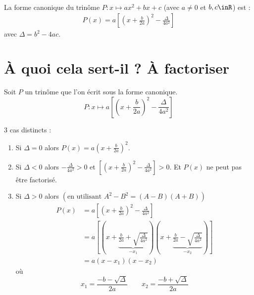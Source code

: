 \documentclass[12pt,fleqn]{report} %
\begin{document}
\begin{definition}\text{ }\\
	La forme canonique du trinôme $P:x \mapsto a x^2 + bx + c$ (avec $a\neq 0$ et $b,c\inR$) est :
	\begin{align*}
	P(x) = a \left[\left(x + \frac{b}{2a}\right)^2 - \frac{\Delta}{4a^2} \right]
	\end{align*}
	avec $\Delta = b^2 - 4ac$.
	
\end{definition}


\section{À quoi cela sert-il ? À factoriser}

Soit $P$ un trinôme que l'on écrit sous la forme canonique.
\[
P : x \mapsto a \left[\left(x + \frac{b}{2a}\right)^2 - \frac{\Delta}{4a^2} \right]
\]

3 cas distincts : 
\begin{enumerate}
	\item Si $\Delta = 0$ alors $P(x) = a \left( x + \frac{b}{2a}\right)^2$.
	\item Si $\Delta < 0$ alors $-\frac{\Delta}{4a^2} >0$ et $\left[\left(x + \frac{b}{2a}\right)^2 - \frac{\Delta}{4a^2} \right] >0$. Et $P(x)$ ne peut pas être factorisé.
	\item Si $\Delta>0$ alors $\left(\text{en utilisant } A^2 - B^2 = (A-B)(A+B)\right)$
	\begin{align*}
	P(x) & = a \left[\left(x + \frac{b}{2a}\right)^2 - \frac{\Delta}{4a^2} \right] \\
	& = a \left[\left(x + \underbrace{\frac{b}{2a} + \sqrt{\frac{\Delta}{4a^2}}}_{-x_1}\right)\left(x + \underbrace{\frac{b}{2a} - \sqrt{\frac{\Delta}{4a^2}}}_{-x_2}\right) \right] \\
	& = a(x - x_1)(x - x_2)
	\end{align*}
	où \[
	x_1 = \frac{-b - \sqrt{\Delta}}{2a}  \qquad x_2 = \frac{-b + \sqrt{\Delta}}{2a}
	\]
\end{enumerate}
\end{document}
